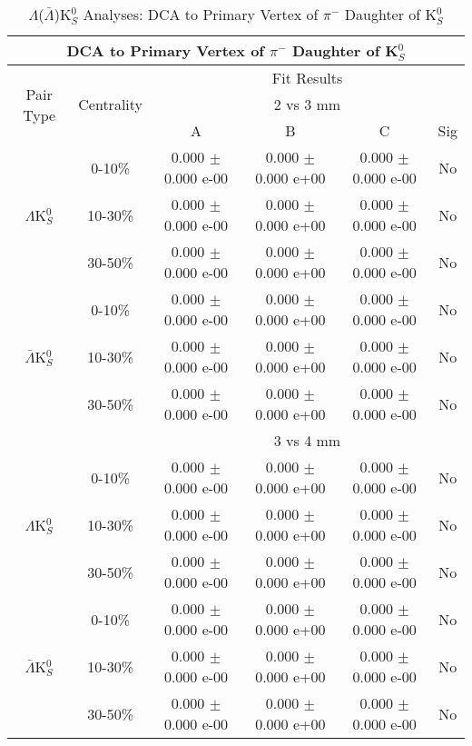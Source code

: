 \documentclass[../AnalysisNoteJBuxton.tex]{subfiles}
\begin{document}
\begin{table}
 \centering
 \begin{tabular}{|c|c|c|c|c|c|}
  \multicolumn{6}{c}{DCA to Primary Vertex of $\pi^{-}$ Daughter of K$^{0}_{S}$} \\
  \hline
  \multirow{3}{*}{Pair Type} & \multirow{3}{*}{Centrality} & \multicolumn{4}{c|}{Fit Results} \\
  \cline{3-6}
   & & \multicolumn{4}{c|}{2 vs 3 mm} \\
  \cline{3-6}
   & & A & B & C & Sig \\
  \hline  
  \multirow{3}{*}{$\Lambda$K$^{0}_{S}$}
   &  0-10\% & 0.000 $\pm$ 0.000 e-00 & 0.000 $\pm$ 0.000 e+00 & 0.000 $\pm$ 0.000 e-00 & No \\
   & 10-30\% & 0.000 $\pm$ 0.000 e-00 & 0.000 $\pm$ 0.000 e+00 & 0.000 $\pm$ 0.000 e-00 & No \\
   & 30-50\% & 0.000 $\pm$ 0.000 e-00 & 0.000 $\pm$ 0.000 e+00 & 0.000 $\pm$ 0.000 e-00 & No \\
  \hline
  \multirow{3}{*}{$\bar{\Lambda}$K$^{0}_{S}$}  
   &  0-10\% & 0.000 $\pm$ 0.000 e-00 & 0.000 $\pm$ 0.000 e+00 & 0.000 $\pm$ 0.000 e-00 & No \\
   & 10-30\% & 0.000 $\pm$ 0.000 e-00 & 0.000 $\pm$ 0.000 e+00 & 0.000 $\pm$ 0.000 e-00 & No \\
   & 30-50\% & 0.000 $\pm$ 0.000 e-00 & 0.000 $\pm$ 0.000 e+00 & 0.000 $\pm$ 0.000 e-00 & No \\
  \hline 
  \multicolumn{2}{|c|}{} & \multicolumn{4}{c|}{3 vs 4 mm} \\
  \hline  
  \multirow{3}{*}{$\Lambda$K$^{0}_{S}$}   
   &  0-10\% & 0.000 $\pm$ 0.000 e-00 & 0.000 $\pm$ 0.000 e+00 & 0.000 $\pm$ 0.000 e-00 & No \\
   & 10-30\% & 0.000 $\pm$ 0.000 e-00 & 0.000 $\pm$ 0.000 e+00 & 0.000 $\pm$ 0.000 e-00 & No \\
   & 30-50\% & 0.000 $\pm$ 0.000 e-00 & 0.000 $\pm$ 0.000 e+00 & 0.000 $\pm$ 0.000 e-00 & No \\
  \hline  
  \multirow{3}{*}{$\bar{\Lambda}$K$^{0}_{S}$}
   & 0-10\% & 0.000 $\pm$ 0.000 e-00 & 0.000 $\pm$ 0.000 e+00 & 0.000 $\pm$ 0.000 e-00 & No \\
   & 10-30\% & 0.000 $\pm$ 0.000 e-00 & 0.000 $\pm$ 0.000 e+00 & 0.000 $\pm$ 0.000 e-00 & No \\
   & 30-50\% & 0.000 $\pm$ 0.000 e-00 & 0.000 $\pm$ 0.000 e+00 & 0.000 $\pm$ 0.000 e-00 & No \\
  \hline
 \end{tabular}
 \caption{$\Lambda$($\bar{\Lambda}$)K$^{0}_{S}$ Analyses: DCA to Primary Vertex of $\pi^{-}$ Daughter of K$^{0}_{S}$}
 \label{tab:DcaToPrimVertexNegPionDaughtOfK0LamK0Full}
\end{table}
\end{document}
